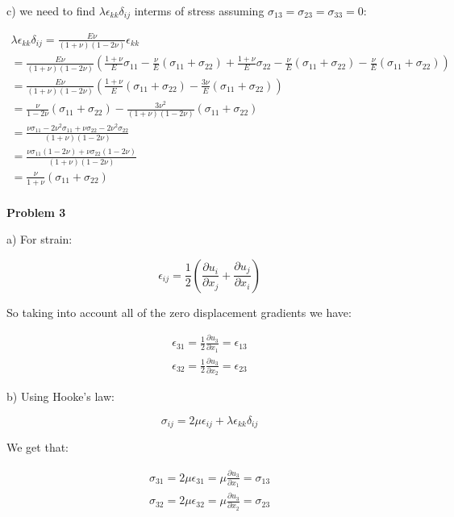 \documentclass{article}
\begin{document}
\noindent c) we need to find $\lambda\epsilon_{kk}\delta_{ij}$ interms of stress assuming $\sigma_{13} = \sigma_{23} = \sigma_{33} = 0$:

\begin{gather*}
  \lambda\epsilon_{kk}\delta_{ij} = \frac{E\nu}{(1+\nu)(1-2\nu)}\epsilon_{kk}\\
  = \frac{E\nu}{(1+\nu)(1-2\nu)} \left(\frac{1 + \nu}{E} \sigma_{11} - \frac{\nu}{E}(\sigma_{11} + \sigma_{22}) + \frac{1 + \nu}{E} \sigma_{22}  - \frac{\nu}{E}(\sigma_{11} + \sigma_{22}) - \frac{\nu}{E}(\sigma_{11} + \sigma_{22})\right)\\
  =  \frac{E\nu}{(1+\nu)(1-2\nu)} \left(\frac{1 + \nu}{E} (\sigma_{11} + \sigma_{22}) -  \frac{3\nu}{E}(\sigma_{11} + \sigma_{22})\right)\\
  = \frac{\nu}{1-2\nu} (\sigma_{11} + \sigma_{22}) - \frac{3\nu^2}{(1+\nu)(1-2\nu)}(\sigma_{11} + \sigma_{22})\\
  = \frac{\nu\sigma_{11} - 2\nu^2\sigma_{11} + \nu\sigma_{22} - 2\nu^2\sigma_{22}}{(1+\nu)(1-2\nu)}\\
  = \frac{\nu\sigma_{11} (1 - 2\nu) + \nu\sigma_{22} (1 - 2\nu)}{(1+\nu)(1-2\nu)}\\
  = \frac{\nu}{1+\nu} (\sigma_{11} + \sigma_{22})\\
\end{gather*}


\noindent\textbf{Problem 3}

a) For strain:

$$ \epsilon_{ij} = \frac12\left(\frac{\partial u_i}{\partial x_j} + \frac{\partial u_j}{\partial x_i}\right)$$

So taking into account all of the zero displacement gradients we have:

\begin{gather*}
  \epsilon_{31} = \frac12\frac{\partial u_3}{\partial x_1} = \epsilon_{13}\\
  \epsilon_{32} = \frac12\frac{\partial u_3}{\partial x_2} = \epsilon_{23}
\end{gather*}

\vspace{3mm}

b) Using Hooke's law:

$$ \sigma_{ij} = 2\mu\epsilon_{ij} + \lambda\epsilon_{kk}\delta_{ij}$$

We get that:

\begin{gather*}
\sigma_{31} = 2\mu\epsilon_{31} = \mu\frac{\partial u_3}{\partial x_1} = \sigma_{13}\\
\sigma_{32} = 2\mu\epsilon_{32} = \mu\frac{\partial u_3}{\partial x_2} = \sigma_{23}\\
\end{gather*}
\end{document}
